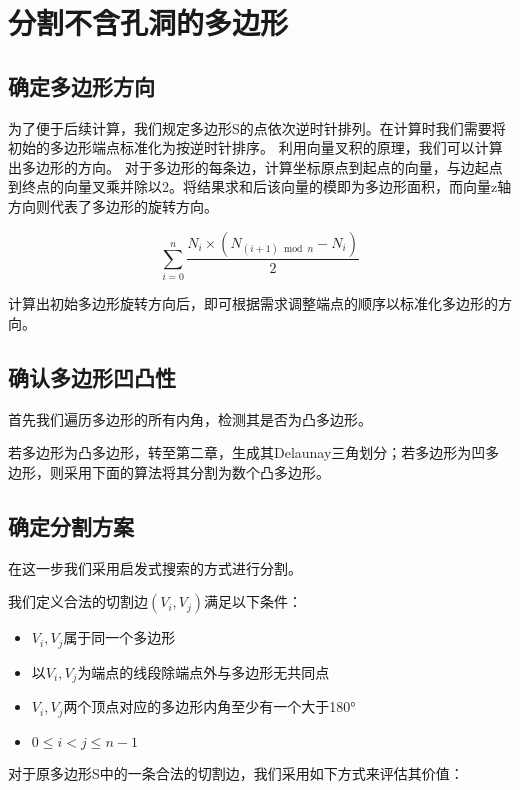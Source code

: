 \chapter{分割不含孔洞的多边形}


\section{确定多边形方向}
为了便于后续计算，我们规定多边形S的点依次逆时针排列。在计算时我们需要将初始的多边形端点标准化为按逆时针排序。
利用向量叉积的原理，我们可以计算出多边形的方向。
对于多边形的每条边，计算坐标原点到起点的向量，与边起点到终点的向量叉乘并除以2。将结果求和后该向量的模即为多边形面积，而向量z轴方向则代表了多边形的旋转方向。

\begin{equation}
\sum\limits_{i=0}^{n}{\frac{N_i\times (N_{(i+1)\bmod n}-N_i)}{2}}
\end{equation}

计算出初始多边形旋转方向后，即可根据需求调整端点的顺序以标准化多边形的方向。

\section{确认多边形凹凸性}
首先我们遍历多边形的所有内角，检测其是否为凸多边形。

若多边形为凸多边形，转至第二章，生成其Delaunay三角划分；若多边形为凹多边形，则采用下面的算法将其分割为数个凸多边形。
\section{确定分割方案}
在这一步我们采用启发式搜索的方式进行分割。

我们定义合法的切割边\(( V_i,V_j) \)满足以下条件：

\begin{itemize}
    \item \(V_i,V_j\)属于同一个多边形
    \item 以\(V_i,V_j\)为端点的线段除端点外与多边形无共同点
    \item \(V_i,V_j\)两个顶点对应的多边形内角至少有一个大于180°
    \item \(0\le i<j\le n-1\)
\end{itemize}
对于原多边形S中的一条合法的切割边，我们采用如下方式来评估其价值：

